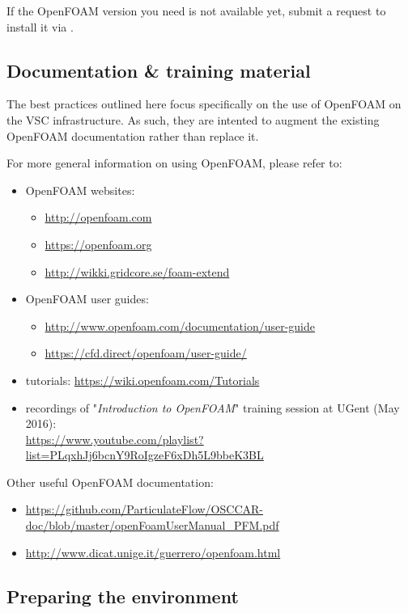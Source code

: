 If the OpenFOAM version you need is not available yet, submit a request to install it via \hpcinfo.


\subsection{Documentation \& training material}
\label{sec:best-practices-openfoam-documentation}

The best practices outlined here focus specifically on the use of OpenFOAM on the VSC \hpc infrastructure.
As such, they are intented to augment the existing OpenFOAM documentation rather than replace it.

For more general information on using OpenFOAM, please refer to:

\begin{itemize}
\item OpenFOAM websites:
\begin{itemize}
    \item \url{http://openfoam.com}
    \item \url{https://openfoam.org}
    \item \url{http://wikki.gridcore.se/foam-extend}
\end{itemize}
\item OpenFOAM user guides:
    \begin{itemize}
    \item \url{http://www.openfoam.com/documentation/user-guide}
    \item \url{https://cfd.direct/openfoam/user-guide/}
    \end{itemize}
\item tutorials: \url{https://wiki.openfoam.com/Tutorials}
\item recordings of "\textit{Introduction to OpenFOAM}" training session at UGent (May 2016):\\
      \small{\url{https://www.youtube.com/playlist?list=PLqxhJj6bcnY9RoIgzeF6xDh5L9bbeK3BL}}
\end{itemize}

Other useful OpenFOAM documentation:

\begin{itemize}
\item \url{https://github.com/ParticulateFlow/OSCCAR-doc/blob/master/openFoamUserManual_PFM.pdf}
\item \url{http://www.dicat.unige.it/guerrero/openfoam.html}
\end{itemize}

\subsection{Preparing the environment}
\label{sec:best-practices-openfoam-environment}

